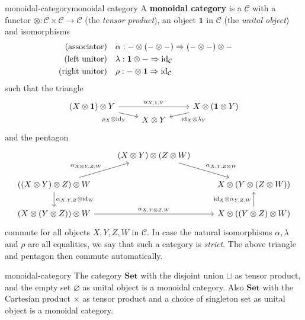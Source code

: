 \begin{topic}{monoidal-category}{monoidal category}
    A \textbf{monoidal category} is a  $\mathcal{C}$ with a functor $\otimes : \mathcal{C} \times \mathcal{C} \to \mathcal{C}$ (the \textit{tensor product}), an object $\textbf{1}$ in $\mathcal{C}$ (the \textit{unital object}) and  isomorphisms
    \[ \begin{aligned}
        \textup{(associator)} &\quad \alpha : - \otimes (- \otimes -) \Rightarrow (- \otimes -) \otimes - \qquad  \\
        \textup{(left unitor)} &\quad \lambda : \textbf{1} \otimes - \Rightarrow \text{id}_{\mathcal{C}} \\
        \textup{(right unitor)} &\quad \rho : - \otimes \textbf{1} \Rightarrow \text{id}_{\mathcal{C}}
    \end{aligned} \]
    such that the triangle
    \[ \begin{tikzcd}[row sep=0em] (X \otimes \textbf{1}) \otimes Y \arrow{rr}{\alpha_{X,\textbf{1},Y}} \arrow[swap]{rd}{\rho_X \otimes \id_Y} & & X \otimes (\textbf{1} \otimes Y) \arrow{ld}{\id_X \otimes \lambda_Y} \\ & X \otimes Y & \end{tikzcd} \]
    and the pentagon
    \[ \begin{tikzcd} & (X \otimes Y) \otimes (Z \otimes W) \arrow{rd}{\alpha_{X, Y, Z \otimes W}} & \\ ((X \otimes Y) \otimes Z) \otimes W \arrow{ur}{\alpha_{X \otimes Y, Z, W}} \arrow{d}{\alpha_{X,Y,Z} \otimes \id_W} & & X \otimes (Y \otimes (Z \otimes W)) \\ (X \otimes (Y \otimes Z)) \otimes W \arrow{rr}{\alpha_{X, Y \otimes Z, W}} & & X \otimes ((Y \otimes Z) \otimes W) \arrow{u}{\id_X \otimes \alpha_{Y, Z, W}} \end{tikzcd} \]
    commute for all objects $X, Y, Z, W$ in $\mathcal{C}$. In case the natural isomorphisms $\alpha, \lambda$ and $\rho$ are all equalities, we say that such a category is \textit{strict}. The above triangle and pentagon then commute automatically.
\end{topic}

\begin{example}{monoidal-category}
    The category $\textbf{Set}$ with the disjoint union $\sqcup$ as tensor product, and the empty set $\varnothing$ as unital object is a monoidal category. Also $\textbf{Set}$ with the Cartesian product $\times$ as tensor product and a choice of singleton set as unital object is a monoidal category.
\end{example}

